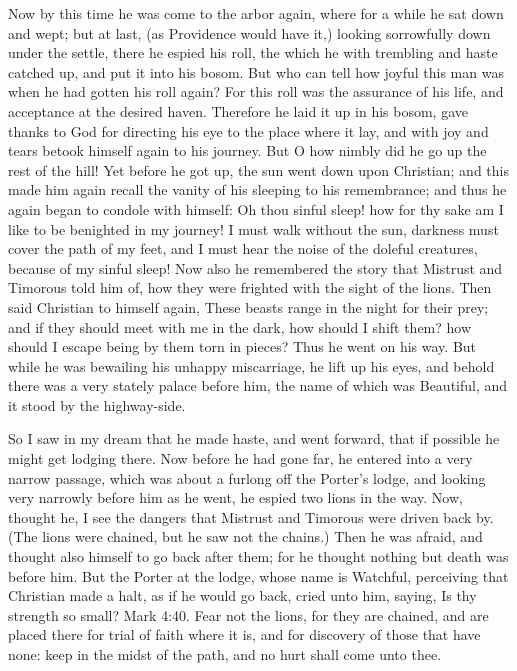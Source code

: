 Now by this time he was come to the arbor again, where for a while he sat down and wept; but at last, (as Providence would have it,) looking sorrowfully down under the settle, there he espied his roll, the which he with trembling and haste catched up, and put it into his bosom. But who can tell how joyful this man was when he had gotten his roll again? For this roll was the assurance of his life, and acceptance at the desired haven. Therefore he laid it up in his bosom, gave thanks to God for directing his eye to the place where it lay, and with joy and tears betook himself again to his journey. But O how nimbly did he go up the rest of the hill! Yet before he got up, the sun went down upon Christian; and this made him again recall the vanity of his sleeping to his remembrance; and thus he again began to condole with himself: Oh thou sinful sleep! how for thy sake am I like to be benighted in my journey! I must walk without the sun, darkness must cover the path of my feet, and I must hear the noise of the doleful creatures, because of my sinful sleep! Now also he remembered the story that Mistrust and Timorous told him of, how they were frighted with the sight of the lions. Then said Christian to himself again, These beasts range in the night for their prey; and if they should meet with me in the dark, how should I shift them? how should I escape being by them torn in pieces? Thus he went on his way. But while he was bewailing his unhappy miscarriage, he lift up his eyes, and behold there was a very stately palace before him, the name of which was Beautiful, and it stood by the highway-side.

So I saw in my dream that he made haste, and went forward, that if possible he might get lodging there. Now before he had gone far, he entered into a very narrow passage, which was about a furlong off the Porter's lodge, and looking very narrowly before him as he went, he espied two lions in the way. Now, thought he, I see the dangers that Mistrust and Timorous were driven back by. (The lions were chained, but he saw not the chains.) Then he was afraid, and thought also himself to go back after them; for he thought nothing but death was before him. But the Porter at the lodge, whose name is Watchful, perceiving that Christian made a halt, as if he would go back, cried unto him, saying, Is thy strength so small? Mark 4:40. Fear not the lions, for they are chained, and are placed there for trial of faith where it is, and for discovery of those that have none: keep in the midst of the path, and no hurt shall come unto thee.


